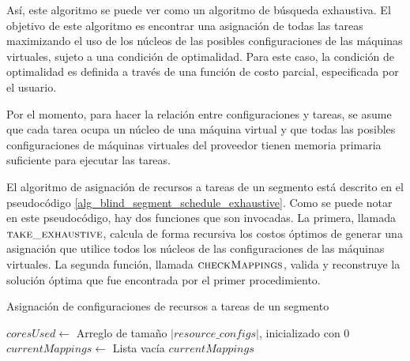 
Así, este algoritmo se puede ver como un algoritmo de búsqueda exhaustiva. El objetivo de este algoritmo es encontrar una asignación de todas las tareas maximizando el uso de los núcleos de las posibles configuraciones de las máquinas virtuales, sujeto a una condición de optimalidad. Para este caso, la condición de optimalidad es definida a trav\'es de una funci\'on de costo parcial, especificada por el usuario. 

Por el momento, para hacer la relaci\'on entre configuraciones y tareas, se asume que cada tarea ocupa un núcleo de una máquina virtual y que todas las posibles configuraciones de máquinas virtuales del proveedor tienen memoria primaria suficiente para ejecutar las tareas.

El algoritmo de asignación de recursos a tareas de un segmento está descrito en el pseudocódigo \ref{alg_blind_segment_schedule_exhaustive}. Como se puede notar en este pseudocódigo, hay dos funciones que son invocadas. La primera, llamada $\Call{take\_exhaustive}{}$, calcula de forma recursiva los costos óptimos de generar una asignación que utilice todos los núcleos de las configuraciones de las máquinas virtuales. La segunda funci\'on, llamada $\Call{checkMappings}{}$, valida y reconstruye la soluci\'on \'optima que fue encontrada por el primer procedimiento.

\begin{algorithm}
\caption{Asignación de configuraciones de recursos a tareas de un segmento}
\label{alg_blind_segment_schedule_exhaustive}
\begin{algorithmic}[1]

	\State $coresUsed \gets$ Arreglo de tamaño $|resource\_configs|$, inicializado con 0
	\State $currentMappings \gets$ Lista vacía	
	\State {}
	\State \Return $currentMappings$
\EndProcedure
\end{algorithmic}
\end{algorithm}


